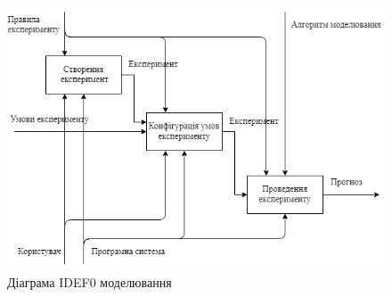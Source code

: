 \begin{figure}[H]
  \centering
    \includegraphics[width=.9\textwidth]{idef0_l2}
  \caption{Діаграма IDEF0 моделювання}
  \label{fig:idef0_l2}
\end{figure}


